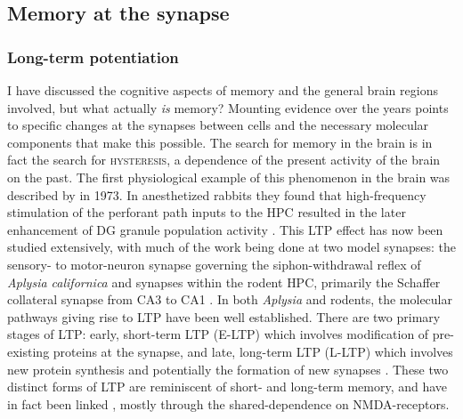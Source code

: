 
\subsection{Memory at the synapse}

\subsubsection{Long-term potentiation}
\label{sec:intro:memory:LTP}
I have discussed the cognitive aspects of memory and the general brain regions involved, but what actually \textit{is} memory?
Mounting evidence over the years points to specific changes at the synapses between cells and the necessary molecular components that make this possible.
The search for memory in the brain is in fact the search for \textsc{hysteresis}, a dependence of the present activity of the brain on the past.
The first physiological example of this phenomenon in the brain was described by \citeauthor{Bliss1973} in 1973.
In anesthetized rabbits they found that high-frequency stimulation of the perforant path inputs to the \ac{HPC} resulted in the later enhancement of \ac{DG} granule population activity \citep{Bliss1973}.
This \ac{LTP} effect has now been studied extensively, with much of the work being done at two model synapses: the sensory- to motor-neuron synapse governing the siphon-withdrawal reflex of \emph{Aplysia californica} and synapses within the rodent \ac{HPC}, primarily the Schaffer collateral synapse from CA3 to CA1 \citep{Kandel2001, Bailey2008}.
In both \emph{Aplysia} and rodents, the molecular pathways giving rise to \ac{LTP} have been well established.
There are two primary stages of \ac{LTP}: early, short-term LTP (E-LTP) which involves modification of pre-existing proteins at the synapse, and late, long-term LTP (L-LTP) which involves new protein synthesis and potentially the formation of new synapses \citep{Frey1988, Bailey2008}.
These two distinct forms of LTP are reminiscent of short- and long-term memory, and have in fact been linked \citep{Moser1998a, Hernandez2008}, mostly through the shared-dependence on NMDA-receptors.


